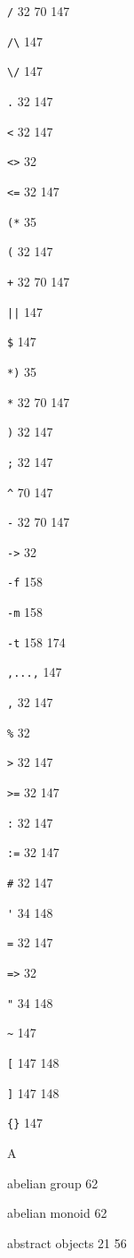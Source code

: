 \item \verb./.  32 70 147
\item \verb./\. 147
\item \verb.\/. 147
\item \verb/./  32 147
\item \verb/</  32 147
\item \verb/<>/ 32
\item \verb/<=/  32 147
\item \verb/(*/ 35
\item \verb/(/  32 147
\item \verb/+/  32 70 147
\item \verb/||/ 147
\item \verb/$/ 147
\item \verb/*)/ 35
\item \verb/*/  32 70 147
\item \verb/)/  32 147
\item \verb/;/  32 147
\item \verb/^/  70 147
\item \verb/-/  32 70 147
\item \verb/->/ 32
\item \verb/-f/ 158
\item \verb/-m/ 158
\item \verb/-t/  158 174
\item \verb/,...,/ 147
\item \verb/,/  32 147
\item \verb/%/ 32
\item \verb/>/  32 147
\item \verb/>=/  32 147
\item \verb/:/  32 147
\item \verb/:=/  32 147
\item \verb/#/  32 147
\item \verb/'/  34 148
\item \verb/=/  32 147
\item \verb/=>/ 32
\item \verb/"/  34 148
\item \verb/~/ 147
\item \verb/[/  147 148
\item \verb/]/  147 148
\item \verb/{}/ 147
\indexspace
\item {\Large A}
\item abelian group 62
\item abelian monoid 62
\item abstract objects  21 56
